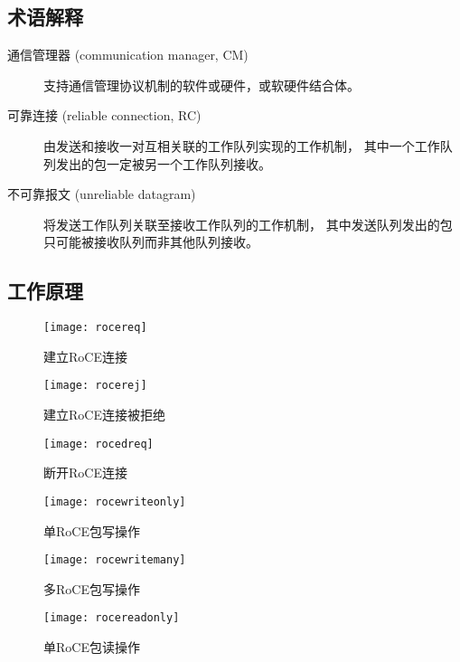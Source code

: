 \subsection{术语解释}
\begin{description}
\item[通信管理器 (communication manager, CM)]支持通信管理协议机制的软件或硬件，或软硬件结合体。
\item[可靠连接 (reliable connection, RC)]由发送和接收一对互相关联的工作队列实现的工作机制，
其中一个工作队列发出的包一定被另一个工作队列接收。
\item[不可靠报文 (unreliable datagram)]将发送工作队列关联至接收工作队列的工作机制，
其中发送队列发出的包只可能被接收队列而非其他队列接收。\cite{volume1}
\end{description}

\subsection{工作原理}
\begin{figure}[htbp]
\centering
\texttt{[image: rocereq]}
\caption{建立RoCE连接} \label{fig:rocereq}
\end{figure}

\begin{figure}[htbp]
\centering
\texttt{[image: rocerej]}
\caption{建立RoCE连接被拒绝} \label{fig:rocerej}
\end{figure}

\begin{figure}[htbp]
\centering
\texttt{[image: rocedreq]}
\caption{断开RoCE连接} \label{fig:rocedreq}
\end{figure}

\begin{figure}[htbp]
\centering
\texttt{[image: rocewriteonly]}
\caption{单RoCE包写操作} \label{fig:rocewriteonly}
\end{figure}

\begin{figure}[htbp]
\centering
\texttt{[image: rocewritemany]}
\caption{多RoCE包写操作} \label{fig:rocewritemany}
\end{figure}

\begin{figure}[htbp]
\centering
\texttt{[image: rocereadonly]}
\caption{单RoCE包读操作} \label{fig:rocereadonly}
\end{figure}

